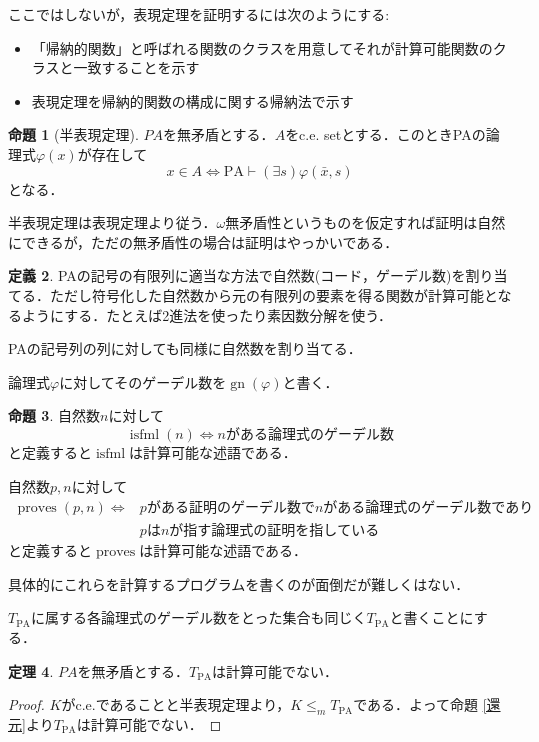 \documentclass[uplatex]{jsarticle}
\theoremstyle{definition} %
\newtheorem{thm}{定理}
\newtheorem{defi}[thm]{定義}
\newtheorem{prop}[thm]{命題}
\begin{document}
ここではしないが，表現定理を証明するには次のようにする:
\begin{itemize}
\item 「帰納的関数」と呼ばれる関数のクラスを用意してそれが計算可能関数のクラスと一致することを示す
\item 表現定理を帰納的関数の構成に関する帰納法で示す
\end{itemize}

\begin{prop}[半表現定理]
$PA$を無矛盾とする．$A$をc.e. setとする．このときPAの論理式$\varphi(x)$が存在して
\[x \in A \iff \mathrm{PA} \vdash (\exists s) \varphi(\bar{x}, s)\]
となる．
\end{prop}

半表現定理は表現定理より従う．$\omega$無矛盾性というものを仮定すれば証明は自然にできるが，ただの無矛盾性の場合は証明はやっかいである．

\begin{defi}
PAの記号の有限列に適当な方法で自然数(コード，ゲーデル数)を割り当てる．ただし符号化した自然数から元の有限列の要素を得る関数が計算可能となるようにする．たとえば2進法を使ったり素因数分解を使う．

PAの記号列の列に対しても同様に自然数を割り当てる．

論理式$\varphi$に対してそのゲーデル数を$\operatorname{gn}(\varphi)$と書く．
\end{defi}

\begin{prop}
自然数$n$に対して
\[\operatorname{isfml}(n) \iff nがある論理式のゲーデル数\]
と定義すると$\operatorname{isfml}$は計算可能な述語である．

自然数$p, n$に対して
\begin{align*}
\operatorname{proves}(p, n) \iff &pがある証明のゲーデル数でnがある論理式のゲーデル数であり \\ 
&pはnが指す論理式の証明を指している
\end{align*}
と定義すると$\operatorname{proves}$は計算可能な述語である．
\end{prop}
具体的にこれらを計算するプログラムを書くのが面倒だが難しくはない．

$T_{\mathrm{PA}}$に属する各論理式のゲーデル数をとった集合も同じく$T_{\mathrm{PA}}$と書くことにする．

\begin{thm}
$PA$を無矛盾とする．$T_{\mathrm{PA}}$は計算可能でない．
\end{thm}
\begin{proof}
$K$がc.e.であることと半表現定理より，$K \le_m T_{\mathrm{PA}}$である．よって命題 \ref{還元}より$T_{\mathrm{PA}}$は計算可能でない．
\end{proof}
\end{document}
